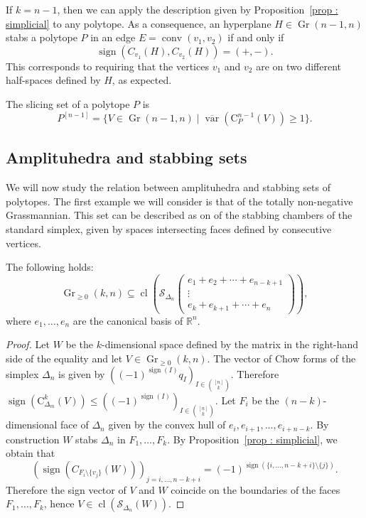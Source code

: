 \documentclass[english]{ourlematema}
\DeclareMathOperator{\Gr}{Gr}
\DeclareMathOperator{\conv}{conv}
\DeclareMathOperator{\sign}{sign}
\DeclareMathOperator{\cl}{cl}
\DeclareMathOperator{\var}{var}
\newcommand{\mS}{\mathcal{S}}
\newcommand{\RR}{\mathbb{R}}
\begin{document}
If $k=n-1$, then we can apply the description given by Proposition~\ref{prop : simplicial} to any polytope. As a consequence, an hyperplane $H \in \Gr(n-1,n)$ stabs a polytope $P$ in an edge $E = \conv(v_1,v_2)$ if and only if 
\[\sign(C_{v_1}(H),C_{v_2}(H)) = (+,-).\] 
This corresponds to requiring that the vertices $v_1$ and $v_2$ are on two different half-spaces defined by $H$, as expected.
\begin{cor}\label{rem : slicing}
    The slicing set of a polytope $P$ is
    \[ P^{[n-1]} = \{ V\in \Gr(n-1,n) \mid \overline{\var}(\mathrm{C}_P^{n-1}(V))\geq 1 \}. \]
\end{cor}

\subsection{Amplituhedra and stabbing sets}\label{sec : stabbing cyclic}

We will now study the relation between amplituhedra and stabbing sets of polytopes. The first example we will consider is that of the totally non-negative Grassmannian. This set can be described as on of the stabbing chambers of the standard simplex, given by spaces intersecting faces defined by consecutive vertices.
\begin{prop}\label{prop : nonneg Grass}
    The following holds:
    \[ \Gr_{\geq 0}(k,n) \subseteq \cl\left(\mS_{\Delta_n}\begin{pmatrix}
        e_1+e_2+\cdots + e_{n-k+1}\\
        \vdots\\
        e_k + e_{k+1}+ \cdots + e_n
    \end{pmatrix} \right), \]
    where $e_1, \ldots, e_n$ are the canonical basis of $\RR^n$.
\end{prop}
\begin{proof}
    Let $W$ be the $k$-dimensional space defined by the matrix in the right-hand side of the equality and let $V\in \Gr_{\geq 0}(k,n)$. The vector of Chow forms of the simplex $\Delta_n$ is given by $((-1)^{\sign(I)}q_I)_{I\in \binom{[n]}{k}}$. Therefore $\sign(\mathrm{C}_{\Delta_m}^k(V)) \leq \left((-1)^{\sign(I)}\right)_{I\in \binom{[n]}{k}}$. Let $F_i$ be the $(n-k)$-dimensional face of $\Delta_n$ given by the convex hull of $e_i,e_{i+1},\ldots, e_{i+n-k}$. By construction $W$ stabs $\Delta_n$ in $F_1, \ldots, F_k$. By Proposition~\ref{prop : simplicial}, we obtain that 
    \[(\sign(C_{F_i\setminus \{v_j\}}(W)))_{j=i,\ldots,n-k+i} = (-1)^{\sign(\{i, \ldots, n-k+i\}\setminus \{j\})}.\] 
    Therefore the sign vector of $V$ and $W$ coincide on the boundaries of the faces $F_1, \ldots, F_k$, hence $V \in \cl(\mS_{\Delta_n}(W))$.
\end{proof}
\end{document}
